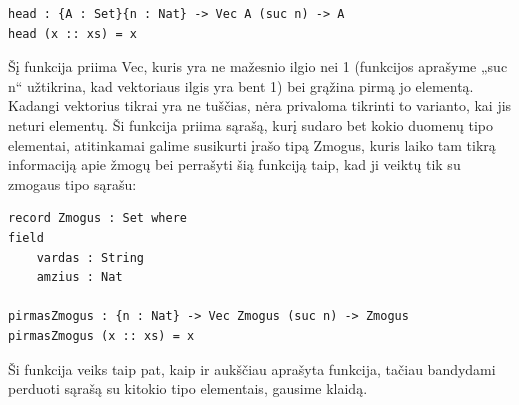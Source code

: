 \documentclass{VUMIFPSkursinis}
\begin{document}
\begin{lstlisting}
head : {A : Set}{n : Nat} -> Vec A (suc n) -> A
head (x :: xs) = x
\end{lstlisting}
Šį funkcija priima Vec, kuris yra ne mažesnio ilgio nei 1 (funkcijos aprašyme „suc n“ užtikrina, kad vektoriaus ilgis yra bent 1) bei grąžina pirmą jo elementą. Kadangi vektorius tikrai yra ne tuščias, nėra privaloma tikrinti to varianto, kai jis neturi elementų. Ši funkcija priima sąrašą, kurį sudaro bet kokio duomenų tipo elementai, atitinkamai galime susikurti įrašo tipą Zmogus, kuris laiko tam tikrą informaciją apie žmogų bei perrašyti šią funkciją taip, kad ji veiktų tik su zmogaus tipo sąrašu:
\begin{lstlisting}
record Zmogus : Set where
field
	vardas : String
	amzius : Nat

pirmasZmogus : {n : Nat} -> Vec Zmogus (suc n) -> Zmogus
pirmasZmogus (x :: xs) = x	
	\end{lstlisting}
Ši funkcija veiks taip pat, kaip ir aukščiau aprašyta funkcija, tačiau bandydami perduoti sąrašą su kitokio tipo elementais, gausime klaidą.	
\end{document}
